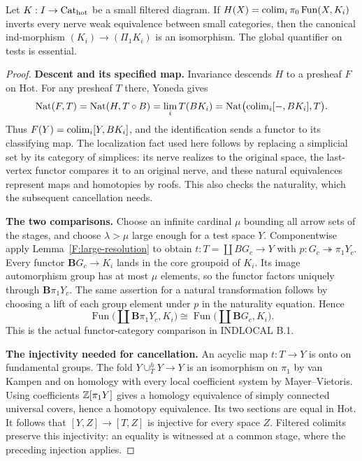 \begin{theorem}\label{F:global-ind-groupoids}
Let $K:I\to\mathrm {Cat}_{\mathrm{hot}}$ be a small filtered diagram. If
$H(X)=\operatorname{colim}_i\pi_0\operatorname{Fun}(X,K_i)$ inverts every nerve
weak equivalence between small categories, then the canonical
ind-morphism $(K_i)\to(\Pi_1K_i)$ is an isomorphism. The global
quantifier on tests is essential.
\end{theorem}
\begin{proof}
\textbf{Descent and its specified map.} Invariance descends $H$ to a
presheaf $F$ on $\mathrm{Hot}$. For any presheaf $T$ there, Yoneda gives
\[
 \operatorname{Nat}(F,T)
 =\operatorname{Nat}(H,T\circ B)
 =\lim_i T(BK_i)
 =\operatorname{Nat}\bigl(\operatorname{colim}_i[-,BK_i],T\bigr).
\]
Thus $F(Y)=\operatorname{colim}_i[Y,BK_i]$, and the identification sends a functor to
its classifying map. The localization fact used here follows by replacing
a simplicial set by its category of simplices: its nerve realizes to the
original space, the last-vertex functor compares it to an original nerve,
and these natural equivalences represent maps and homotopies by roofs.
This also checks the naturality, which the subsequent cancellation needs.

\textbf{The two comparisons.} Choose an infinite cardinal $\mu$ bounding
all arrow sets of the stages, and choose $\lambda>\mu$ large enough for
a test space $Y$. Componentwise apply Lemma~\ref{F:large-resolution} to
obtain $t:T=\coprod BG_c\to Y$ with $p:G_c\twoheadrightarrow\pi_1Y_c$.
Every functor $\mathbf BG_c\to K_i$ lands in the core groupoid of $K_i$.
Its image automorphism group has at most $\mu$ elements, so the functor
factors uniquely through $\mathbf B\pi_1Y_c$. The same assertion for a
natural transformation follows by choosing a lift of each group element
under $p$ in the naturality equation. Hence
\[
 \operatorname{Fun}\bigl(\coprod\mathbf B\pi_1Y_c,K_i\bigr)
 \cong \operatorname{Fun}\bigl(\coprod\mathbf BG_c,K_i\bigr).
\]
This is the actual functor-category comparison in INDLOCAL B.1.

\textbf{The injectivity needed for cancellation.} An acyclic map
$t:T\to Y$ is onto on fundamental groups. The fold
$Y\cup_T^hY\to Y$ is an isomorphism on $\pi_1$ by van Kampen and on
homology with every local coefficient system by Mayer--Vietoris.
Using coefficients $\mathbb Z[\pi_1Y]$ gives a homology equivalence of simply
connected universal covers, hence a homotopy equivalence. Its two
sections are equal in $\mathrm{Hot}$. It follows that
$[Y,Z]\to[T,Z]$ is injective for every space $Z$. Filtered colimits
preserve this injectivity: an equality is witnessed at a common stage,
where the preceding injection applies.


\end{proof}
